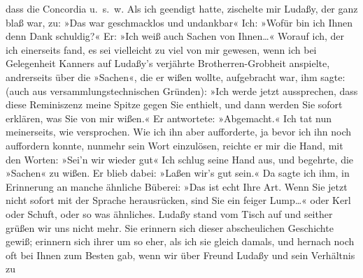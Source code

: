 \begin{ledgroupsized}[t]{13cm}
               dass die Concordia u. s. w. Als ich geendigt
               hatte, zischelte mir Ludaßy, der ganz blaß
               war, zu: »Das war geschmacklos und undankbar{\dotstwo}« Ich: »Wofür
               bin ich Ihnen denn Dank schuldig?« Er: »Ich weiß auch Sachen von Ihnen{\dots}« Worauf ich, der ich einerseits fand, es sei vielleicht
               zu viel von mir gewesen, wenn ich bei Gelegenheit Kanners auf Ludaßy’s verjährte
               Brotherren-Grobheit anspielte, andrerseits über die »Sachen«, die er wißen wollte,
               aufgebracht war, ihm sagte: (auch aus versammlungstechnischen Gründen): »Ich werde
               jetzt aussprechen, dass diese Reminiszenz meine Spitze gegen Sie enthielt, und dann
               werden Sie sofort erklären, was Sie von mir wißen.« Er antwortete: »Abgemacht.« Ich
               tat nun meinerseits, wie versprochen. Wie ich ihn aber aufforderte, ja bevor ich ihn
               noch auffordern konnte, nunmehr sein Wort einzulösen, reichte er mir die Hand, mit
               den Worten: »Sei’n wir wieder gut{\dotstwo}« Ich schlug seine Hand
               aus, und begehrte, die »Sachen« zu wißen. Er blieb dabei: »Laßen wir’s gut sein.« Da
               sagte ich ihm, in Erinnerung an manche ähnliche Büberei: »Das ist echt Ihre Art. Wenn
               Sie jetzt nicht sofort mit {\pb}der
               Sprache herausrücken, sind Sie ein feiger Lump{\dots}« oder
                  Kerl{\dotstwo} oder Schuft, oder so was ähnliches. Ludaßy stand vom Tisch auf und seither grüßen
               wir uns nicht mehr.\pend
           \pstart
           Sie erinnern sich dieser abscheulichen Geschichte gewiß; erinnern sich ihrer um so
               eher, als ich sie gleich damals, und hernach noch oft bei Ihnen zum Besten gab, wenn
               wir über Freund Ludaßy und sein Verhältnis zu

\end{ledgroupsized}
